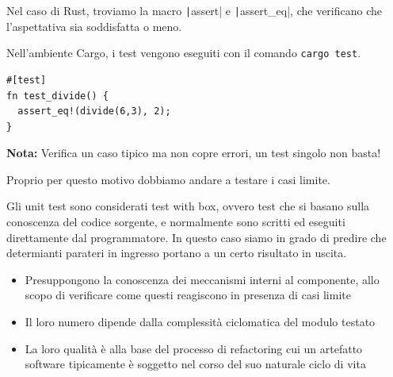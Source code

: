 
Nel caso di Rust, troviamo la macro \texttt|assert| e \texttt|assert_eq|,
che verificano che l'aspettativa sia soddisfatta o meno.

Nell'ambiente Cargo, i test vengono eseguiti con il comando \verb|cargo test|.




\begin{verbatim}
#[test]
fn test_divide() {
  assert_eq!(divide(6,3), 2);
}
\end{verbatim}

\begin{tcolorbox}
  \textbf{Nota:} Verifica un caso tipico ma non copre errori, un test singolo non
  basta!
\end{tcolorbox}

Proprio per questo motivo dobbiamo andare a testare i casi limite.

Gli unit test sono considerati test with box, ovvero test che si basano sulla conoscenza del codice sorgente, e
normalmente sono scritti ed eseguiti direttamente dal programmatore.
In questo caso siamo in grado di predire che determianti parateri in ingresso portano a un certo risultato in uscita.



\begin{itemize}
  \item Presuppongono la conoscenza dei  meccanismi interni al componente, allo scopo di verificare come
        questi reagiscono in presenza di casi limite
  \item Il loro numero dipende dalla complessità ciclomatica del modulo testato
  \item La loro qualità è alla base del processo di refactoring cui un artefatto software tipicamente è soggetto
        nel corso del suo naturale ciclo di vita
\end{itemize}

